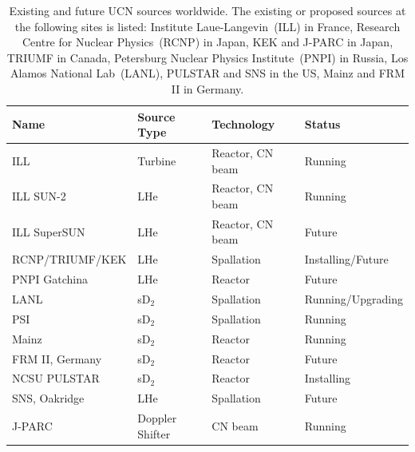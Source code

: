 \begin{table}[h!]
\begin{center}
\begin{tabular}{|l|l|l|l|}
\hline
Name & Source Type & Technology & Status \\
  \hline
  \hline
ILL  & Turbine & Reactor, CN beam & Running
\\
\hline
ILL SUN-2 & LHe & Reactor, CN beam & Running 
\\
\hline
ILL SuperSUN & LHe & Reactor, CN beam & Future
\\
\hline
RCNP/TRIUMF/KEK & LHe & Spallation & Installing/Future
\\
\hline
PNPI Gatchina & LHe & Reactor & Future
\\
\hline
LANL & sD$_2$ & Spallation & Running/Upgrading
\\
\hline
PSI & sD$_2$ & Spallation & Running
\\
\hline
Mainz & sD$_2$ & Reactor & Running
\\
\hline
FRM II, Germany & sD$_2$ & Reactor & Future
\\
\hline
NCSU PULSTAR & sD$_2$ & Reactor & Installing
  \\
  \hline
  SNS, Oakridge & LHe & Spallation & Future
  \\
  \hline
  J-PARC & Doppler Shifter & CN beam & Running
  \\
  \hline
\end{tabular}
\end{center}
\caption[UCN facilities worldwide]{Existing and future UCN sources
  worldwide. The existing or proposed sources at the following sites
  is listed: Institute Laue-Langevin~(ILL) in France, Research Centre
  for Nuclear Physics~(RCNP) in Japan, KEK and J-PARC in Japan, TRIUMF
  in Canada, Petersburg Nuclear Physics Institute~(PNPI) in Russia,
  Los Alamos National Lab~(LANL), PULSTAR and SNS in the US, Mainz and
  FRM II in Germany. }
\label{tab:full_ucn_sources}
\end{table}


